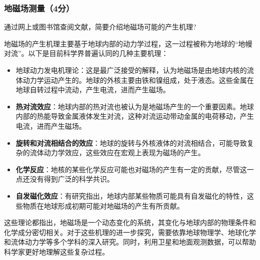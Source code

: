 \documentclass[dvipsnames, svgnames,a4paper,11pt]{article}
\begin{document}
	\subsubsection{地磁场测量（4分）}
	通过网上或图书馆查阅文献，简要介绍地磁场可能的产生机理?
	
	地磁场的产生机理主要基于地球内部的动力学过程，这一过程被称为地球的“地幔对流”。以下是目前科学界普遍认同的几种主要机理：
	
	\begin{itemize}
		\item 地球动力发电机理论：这是最广泛接受的解释，认为地磁场是由地球内核的流体动力学运动产生的。地球的外核主要由铁和镍组成，处于液态。这些金属在地球自转过程中流动，产生电流，进而产生磁场。
		
		\item \textbf{热对流效应}：地球内部的热对流也被认为是地磁场产生的一个重要因素。地球内部的热能导致金属液体发生对流，这种对流运动带动金属的电荷移动，产生电流，进而产生磁场。
		
		\item \textbf{旋转和对流相结合的效应}：地球的旋转与外核液体的对流相结合，可能导致复杂的流体动力学效应，这些效应在宏观上表现为磁场的产生。
		
		\item \textbf{化学反应}：地核的某些化学反应可能也对磁场的产生有一定的贡献，尽管这一点还没有得到广泛的科学共识。
		
		\item \textbf{自发磁化效应}：有研究指出，地球内部某些物质可能具有自发磁化的特性，这些物质在地球形成初期可能对地磁场的产生有所贡献。
	\end{itemize}
	
	这些理论都指出，地磁场是一个动态变化的系统，其变化与地球内部的物理条件和化学成分密切相关。对于这些机理的进一步探究，需要依靠地球物理学、地球化学和流体动力学等多个学科的深入研究。同时，利用卫星和地面观测数据，可以帮助科学家更好地理解这些复杂过程。
	
\end{document}
